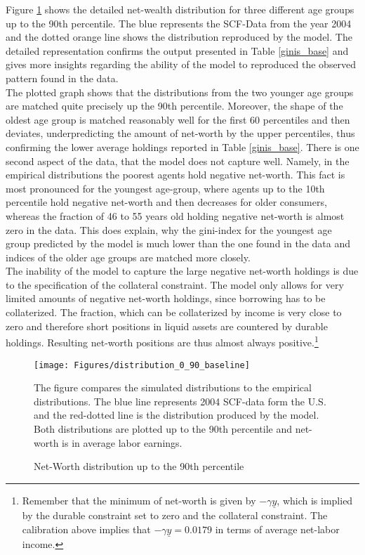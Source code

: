 \documentclass[a4paper,12pt,legno]{article}
\begin{document}
Figure \ref{wealth_distr_base} shows the detailed net-wealth distribution for three different age groups up to the 90th percentile. The blue represents the SCF-Data from the year 2004 and the dotted orange line shows the distribution reproduced by the model. The detailed representation confirms the output presented in Table \ref{ginis_base} and gives more insights regarding the ability of the model to reproduced the observed pattern found in the data. \\ 
The plotted graph shows that the distributions from the two younger age groups are matched quite precisely up the 90th percentile. Moreover, the shape of the oldest age group is matched reasonably well for the first 60 percentiles and then deviates, underpredicting the amount of net-worth by the upper percentiles, thus confirming the lower average holdings reported in Table \ref{ginis_base}. There is one second aspect of the data, that the model does not capture well. Namely, in the empirical distributions the poorest agents hold negative net-worth. This fact is most pronounced for the youngest age-group, where agents up to the 10th percentile hold negative net-worth and then decreases for older consumers, whereas the fraction of 46 to 55 years old holding negative net-worth is almost zero in the data. This does explain, why the gini-index for the youngest age group predicted by the model is much lower than the one found in the data and indices of the older age groups are matched more closely.\\ The inability of the model to capture the large negative net-worth holdings is due to the specification of the collateral constraint. The model only allows for very limited amounts of negative net-worth holdings, since borrowing has to be collaterized. The fraction, which can be collaterized by income is very close to zero and therefore short positions in liquid assets are countered by durable holdings. Resulting net-worth positions are thus almost always positive.\footnote{Remember that the minimum of net-worth is given by $-\gamma\underline{y}$, which is implied by the durable constraint set to zero and the collateral constraint. The calibration above implies that $-\gamma\underline{y} = 0.0179$ in terms of average net-labor income.} 


\begin{figure}[!htbp]
\caption{Net-Worth distribution up to the 90th percentile} 
\label{wealth_distr_base}	%
\centering
\texttt{[image: Figures/distribution\_0\_90\_baseline]}  %

\begin{minipage}{0.8\linewidth}
\footnotesize{The figure compares the simulated distributions to the empirical distributions. The blue line represents 2004 SCF-data form the U.S. and the red-dotted line is the distribution produced by the model. Both distributions are plotted up to the 90th percentile and net-worth is in average labor earnings.}
\end{minipage}

\end{figure}
\end{document}
